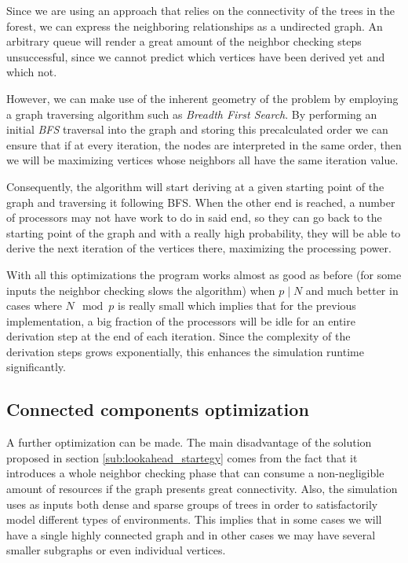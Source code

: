 \documentclass[letterpaper,twoside,11pt]{article}
\begin{document}
\begin{multicols}{2}
\begin{compactenum}[a)]
Since we are using an approach that relies on the connectivity of the trees in the forest, we can express the neighboring relationships as a undirected graph. An arbitrary queue will render a great amount of the neighbor checking steps unsuccessful, since we cannot predict which vertices have been derived yet and which not.

However, we can make use of the inherent geometry of the problem by employing a graph traversing algorithm such as \emph{Breadth First Search}. By performing an initial \emph{BFS} traversal into the graph and storing this precalculated order we can ensure that if at every iteration, the nodes are interpreted in the same order, then we will be maximizing vertices whose neighbors all have the same iteration value.

Consequently, the algorithm will start deriving at a given starting point of the graph and traversing it following BFS. When the other end is reached, a number of processors may not have work to do in said end, so they can go back to the starting point of the graph and  with a really high probability, they will be able to derive the next iteration of the vertices there, maximizing the processing power.

\end{compactenum}

With all this optimizations the program works almost as good as before (for some inputs the neighbor checking slows the algorithm) when $p \mid N$ and much better in cases where $N \mod p$ is really small which implies that for the previous implementation, a big fraction of the processors will be idle for an entire derivation step at the end of each iteration. Since the complexity of the derivation steps grows exponentially, this enhances the simulation runtime significantly.



\subsection{Connected components optimization} %
\label{sub:connected_components}

A further optimization can be made. The main disadvantage of the solution proposed in section \ref{sub:lookahead_startegy} comes from the fact that it introduces a whole neighbor checking phase that can consume a non-negligible amount of resources if the graph presents great connectivity. Also, the simulation uses as inputs both dense and sparse groups of trees in order to satisfactorily model different types of environments. This implies that in some cases we will have a single highly connected graph and in other cases we may have several smaller subgraphs or even individual vertices.


\end{multicols}
\end{document}

